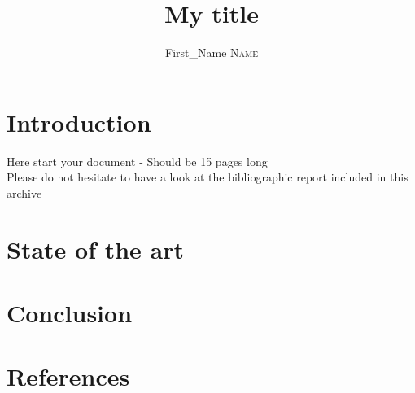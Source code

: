 \documentclass[11pt]{sdm}
\title{My title}
\author{First\_Name \textsc{Name}}
\begin{document}
\maketitle


\section{Introduction}

Here start your document - Should be 15 pages long \\

Please do not hesitate to have a look at the bibliographic report included in this archive 

\section{State of the art}

\section{Conclusion}

\section*{References}
\end{document}
